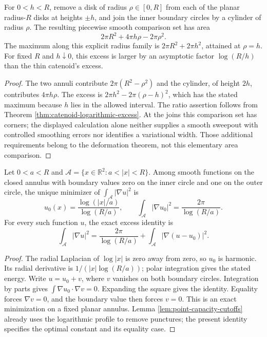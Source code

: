 \begin{example}\label{ex:cylindrical-neck-cost}
For $0<h<R$, remove a disk of radius $\rho\in[0,R]$ from each of the planar radius-$R$ disks at heights $\pm h$, and join the inner boundary circles by a cylinder of radius $\rho$. The resulting piecewise smooth comparison set has area
\[
 2\pi R^2+4\pi h\rho-2\pi\rho^2.
\]
The maximum along this explicit radius family is $2\pi R^2+2\pi h^2$, attained at $\rho=h$. For fixed $R$ and $h\downarrow0$, this excess is larger by an asymptotic factor $\log(R/h)$ than the thin catenoid's excess.
\end{example}
\begin{proof}
The two annuli contribute $2\pi(R^2-\rho^2)$ and the cylinder, of height $2h$, contributes $4\pi h\rho$. The excess is $2\pi h^2-2\pi(\rho-h)^2$, which has the stated maximum because $h$ lies in the allowed interval. The ratio assertion follows from Theorem \ref{thm:catenoid-logarithmic-excess}. At the joins this comparison set has corners; the displayed calculation alone neither supplies a smooth sweepout with controlled smoothing errors nor identifies a variational width. Those additional requirements belong to the deformation theorem, not this elementary area comparison.
\end{proof}

\begin{proposition}\label{prop:planar-annulus-exact-energy}
Let $0<a<R$ and $\mathcal A=\{x\in\mathbb R^2:a<|x|<R\}$. Among smooth functions on the closed annulus with boundary values zero on the inner circle and one on the outer circle, the unique minimizer of $\int_{\mathcal A}|\nabla u|^2$ is
\[
 u_0(x)=\frac{\log(|x|/a)}{\log(R/a)},\qquad
 \int_{\mathcal A}|\nabla u_0|^2=\frac{2\pi}{\log(R/a)}.
\]
For every such function $u$, the exact excess identity is
\[
 \int_{\mathcal A}|\nabla u|^2
 =\frac{2\pi}{\log(R/a)}+\int_{\mathcal A}|\nabla(u-u_0)|^2.
\]
\end{proposition}
\begin{proof}
The radial Laplacian of $\log|x|$ is zero away from zero, so $u_0$ is harmonic. Its radial derivative is $1/(|x|\log(R/a))$; polar integration gives the stated energy. Write $u=u_0+v$, where $v$ vanishes on both boundary circles. Integration by parts gives $\int\nabla u_0\cdot\nabla v=0$. Expanding the square gives the identity. Equality forces $\nabla v=0$, and the boundary value then forces $v=0$. This is an exact minimization on a fixed planar annulus. Lemma \ref{lem:point-capacity-cutoffs} already uses the logarithmic profile to remove punctures; the present identity specifies the optimal constant and its equality case.
\end{proof}

